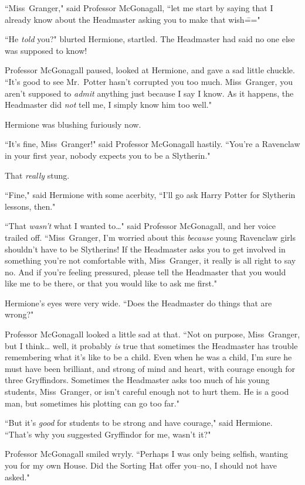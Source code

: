 ``Miss~Granger," said Professor McGonagall, ``let me start by saying that I already know about the Headmaster asking you to make that wish\==="

``He \emph{told} you?" blurted Hermione, startled. The Headmaster had said no one else was supposed to know!

Professor McGonagall paused, looked at Hermione, and gave a sad little chuckle. ``It's good to see Mr.~Potter hasn't corrupted you too much. Miss~Granger, you aren't supposed to \emph{admit} anything just because I say I know. As it happens, the Headmaster did \emph{not} tell me, I simply know him too well."

Hermione was blushing furiously now.

``It's fine, Miss~Granger!" said Professor McGonagall hastily. ``You're a Ravenclaw in your first year, nobody expects you to be a Slytherin."

That \emph{really} stung.

``Fine," said Hermione with some acerbity, ``I'll go ask Harry Potter for Slytherin lessons, then."

``That \emph{wasn't} what I wanted to{\ldots}" said Professor McGonagall, and her voice trailed off. ``Miss~Granger, I'm worried about this \emph{because} young Ravenclaw girls shouldn't have to be Slytherins! If the Headmaster asks you to get involved in something you're not comfortable with, Miss~Granger, it really is all right to say no. And if you're feeling pressured, please tell the Headmaster that you would like me to be there, or that you would like to ask me first."

Hermione's eyes were very wide. ``Does the Headmaster do things that are wrong?"

Professor McGonagall looked a little sad at that. ``Not on purpose, Miss~Granger, but I think{\ldots} well, it probably \emph{is} true that sometimes the Headmaster has trouble remembering what it's like to be a child. Even when he was a child, I'm sure he must have been brilliant, and strong of mind and heart, with courage enough for three Gryffindors. Sometimes the Headmaster asks too much of his young students, Miss~Granger, or isn't careful enough not to hurt them. He is a good man, but sometimes his plotting can go too far."

``But it's \emph{good} for students to be strong and have courage," said Hermione. ``That's why you suggested Gryffindor for me, wasn't it?"

Professor McGonagall smiled wryly. ``Perhaps I was only being selfish, wanting you for my own House. Did the Sorting Hat offer you\---no, I should not have asked."

